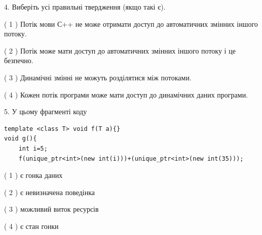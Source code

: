 \documentclass[12pt, ukrainian]{article}
\begin{document}
\begin {large}
{%
4. Виберіть усі правильні твердження (якщо такі є).\par
\vspace{2mm}

( 1 ) Потік мови С++ не може отримати доступ до автоматичних змінних іншого потоку.%

( 2 ) Потік може мати доступ до автоматичних змінних іншого потоку і це безпечно.%

( 3 ) Динамічні змінні не можуть розділятися між потоками.%

( 4 ) Кожен потік програми може мати доступ до динамічних даних програми.%


5. У цьому фрагменті коду
\begin{verbatim}
template <class T> void f(T a){}
void g(){
    int i=5;
    f(unique_ptr<int>(new int(i)))+(unique_ptr<int>(new int(35)));
\end{verbatim}
( 1 ) є гонка даних%

( 2 ) є невизначена поведінка%

( 3 ) можливий виток ресурсів%

( 4 ) є стан гонки%
}
\end {large}
\end{document}
